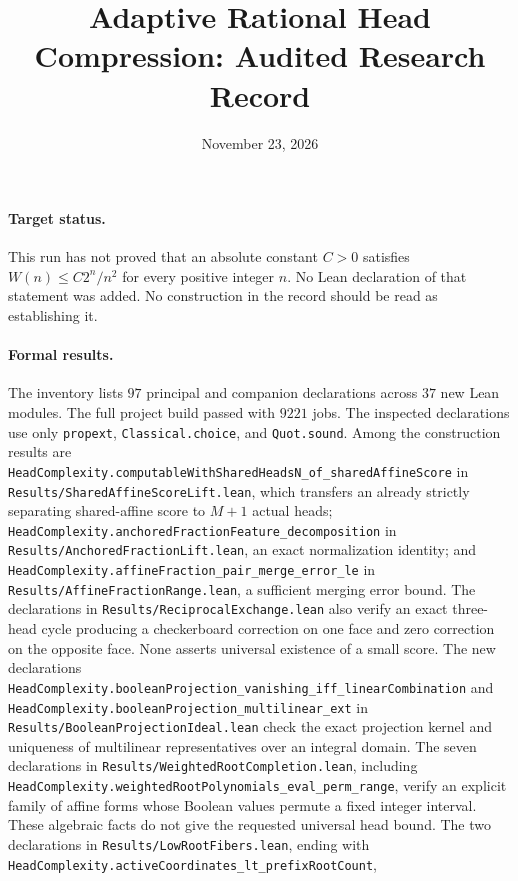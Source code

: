 \documentclass[11pt]{article}
\title{Adaptive Rational Head Compression: Audited Research Record}
\author{}
\date{November 23, 2026}
\begin{document}
\maketitle

\paragraph{Target status.}
This run has not proved that an absolute constant $C>0$ satisfies
$W(n)\le C2^n/n^2$ for every positive integer $n$. No Lean declaration
of that statement was added. No construction in the record should be
read as establishing it.

\paragraph{Formal results.}
The inventory lists $97$ principal and companion declarations across
$37$ new Lean modules. The full project build passed with $9221$ jobs.
The inspected declarations use only \texttt{propext},
\texttt{Classical.choice}, and \texttt{Quot.sound}.
Among the construction results are
\texttt{HeadComplexity.computableWithSharedHeadsN\_of\_sharedAffineScore}
in \texttt{Results/SharedAffineScoreLift.lean}, which transfers an
already strictly separating shared-affine score to $M+1$ actual heads;
\texttt{HeadComplexity.anchoredFractionFeature\_decomposition}
in \texttt{Results/AnchoredFractionLift.lean}, an exact normalization
identity; and
\texttt{HeadComplexity.affineFraction\_pair\_merge\_error\_le}
in \texttt{Results/AffineFractionRange.lean}, a sufficient merging
error bound. The declarations in \texttt{Results/ReciprocalExchange.lean}
also verify an exact three-head cycle producing a checkerboard correction
on one face and zero correction on the opposite face. None asserts
universal existence of a small score. The new declarations
\texttt{HeadComplexity.booleanProjection\_vanishing\_iff\_linearCombination}
and \texttt{HeadComplexity.booleanProjection\_multilinear\_ext}
in \texttt{Results/BooleanProjectionIdeal.lean} check the exact projection
kernel and uniqueness of multilinear representatives over an integral
domain. The seven declarations in
\texttt{Results/WeightedRootCompletion.lean}, including
\texttt{HeadComplexity.weightedRootPolynomials\_eval\_perm\_range},
verify an explicit family of affine forms whose Boolean values permute
a fixed integer interval. These algebraic facts do not give the
requested universal head bound.
The two declarations in \texttt{Results/LowRootFibers.lean}, ending
with \texttt{HeadComplexity.activeCoordinates\_lt\_prefixRootCount},
\end{document}
